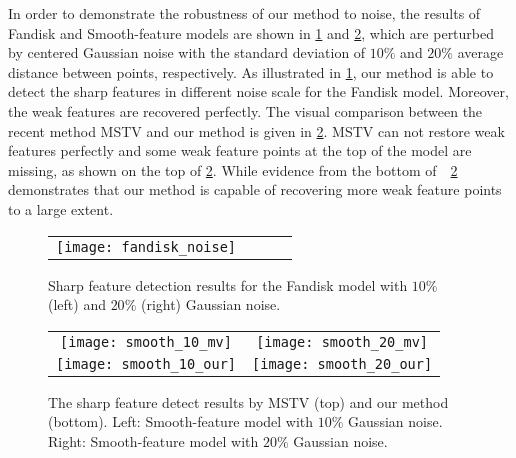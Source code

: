 In order to demonstrate the robustness of our method to noise, the results of Fandisk and Smooth-feature models are shown in \fig \ref{fig:noise} and \fig \ref{fig:compare_feature}, which are perturbed by centered Gaussian noise with the standard deviation of $10\%$ and $20\%$ average distance between points, respectively.
%
As illustrated in \fig \ref{fig:noise}, our method is able to detect the sharp features in different noise scale for the Fandisk model.
%
Moreover, the weak features are recovered perfectly.
%
The visual comparison between the recent method MSTV and our method is given in
\fig \ref{fig:compare_feature}.
%
MSTV can not restore weak features perfectly and some weak feature points at the top of the model are missing, as shown on the top of  \fig \ref{fig:compare_feature}.
%
%
%
While evidence from the bottom of~\fig~\ref{fig:compare_feature} demonstrates that our method is capable of recovering more weak feature points to a large extent.

\begin{figure}[htcb]
  \centering
  \begin{tabular}{c c c c}
        \texttt{[image: fandisk\_noise]}
    \end{tabular}
  \caption{\label{fig:noise}
   Sharp feature detection results for the Fandisk model with $10\%$ (left) and $20\%$ (right) Gaussian noise.
   }
\end{figure}
\begin{figure}[htbp]
\begin{center}
    \begin{tabular}{c c }
        \texttt{[image: smooth\_10\_mv]} &
        \texttt{[image: smooth\_20\_mv]} \\
        \texttt{[image: smooth\_10\_our]} &
        \texttt{[image: smooth\_20\_our]}
    \end{tabular}
    \caption{The sharp feature detect results by MSTV (top) and our method (bottom). Left: Smooth-feature model with $10\%$ Gaussian noise. Right: Smooth-feature model with $20\%$ Gaussian noise. \label{fig:compare_feature}}
\end{center}
\end{figure}
